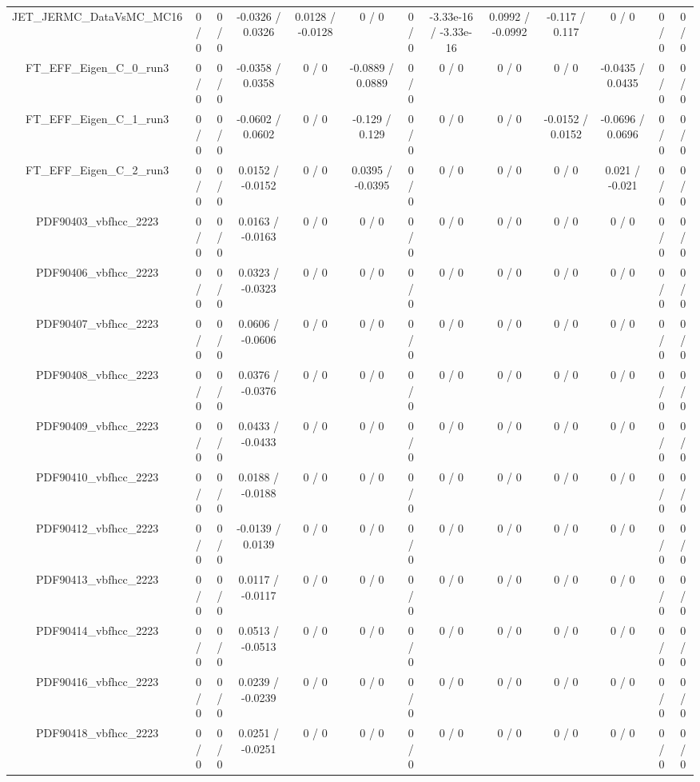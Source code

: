 \documentclass[10pt]{article}
\begin{document}
\begin{table}[htbp]
\begin{center}
\begin{tabular}{|c|c|c|c|c|c|c|c|c|c|c|c|c|}
  JET_JERMC_DataVsMC_MC16 & 0 / 0 & 0 / 0 & -0.0326 / 0.0326 & 0.0128 / -0.0128 & 0 / 0 & 0 / 0 & -3.33e-16 / -3.33e-16 & 0.0992 / -0.0992 & -0.117 / 0.117 & 0 / 0 & 0 / 0 & 0 / 0 \\ 
  FT_EFF_Eigen_C_0_run3 & 0 / 0 & 0 / 0 & -0.0358 / 0.0358 & 0 / 0 & -0.0889 / 0.0889 & 0 / 0 & 0 / 0 & 0 / 0 & 0 / 0 & -0.0435 / 0.0435 & 0 / 0 & 0 / 0 \\ 
  FT_EFF_Eigen_C_1_run3 & 0 / 0 & 0 / 0 & -0.0602 / 0.0602 & 0 / 0 & -0.129 / 0.129 & 0 / 0 & 0 / 0 & 0 / 0 & -0.0152 / 0.0152 & -0.0696 / 0.0696 & 0 / 0 & 0 / 0 \\ 
  FT_EFF_Eigen_C_2_run3 & 0 / 0 & 0 / 0 & 0.0152 / -0.0152 & 0 / 0 & 0.0395 / -0.0395 & 0 / 0 & 0 / 0 & 0 / 0 & 0 / 0 & 0.021 / -0.021 & 0 / 0 & 0 / 0 \\ 
  PDF90403_vbfhcc_2223 & 0 / 0 & 0 / 0 & 0.0163 / -0.0163 & 0 / 0 & 0 / 0 & 0 / 0 & 0 / 0 & 0 / 0 & 0 / 0 & 0 / 0 & 0 / 0 & 0 / 0 \\ 
  PDF90406_vbfhcc_2223 & 0 / 0 & 0 / 0 & 0.0323 / -0.0323 & 0 / 0 & 0 / 0 & 0 / 0 & 0 / 0 & 0 / 0 & 0 / 0 & 0 / 0 & 0 / 0 & 0 / 0 \\ 
  PDF90407_vbfhcc_2223 & 0 / 0 & 0 / 0 & 0.0606 / -0.0606 & 0 / 0 & 0 / 0 & 0 / 0 & 0 / 0 & 0 / 0 & 0 / 0 & 0 / 0 & 0 / 0 & 0 / 0 \\ 
  PDF90408_vbfhcc_2223 & 0 / 0 & 0 / 0 & 0.0376 / -0.0376 & 0 / 0 & 0 / 0 & 0 / 0 & 0 / 0 & 0 / 0 & 0 / 0 & 0 / 0 & 0 / 0 & 0 / 0 \\ 
  PDF90409_vbfhcc_2223 & 0 / 0 & 0 / 0 & 0.0433 / -0.0433 & 0 / 0 & 0 / 0 & 0 / 0 & 0 / 0 & 0 / 0 & 0 / 0 & 0 / 0 & 0 / 0 & 0 / 0 \\ 
  PDF90410_vbfhcc_2223 & 0 / 0 & 0 / 0 & 0.0188 / -0.0188 & 0 / 0 & 0 / 0 & 0 / 0 & 0 / 0 & 0 / 0 & 0 / 0 & 0 / 0 & 0 / 0 & 0 / 0 \\ 
  PDF90412_vbfhcc_2223 & 0 / 0 & 0 / 0 & -0.0139 / 0.0139 & 0 / 0 & 0 / 0 & 0 / 0 & 0 / 0 & 0 / 0 & 0 / 0 & 0 / 0 & 0 / 0 & 0 / 0 \\ 
  PDF90413_vbfhcc_2223 & 0 / 0 & 0 / 0 & 0.0117 / -0.0117 & 0 / 0 & 0 / 0 & 0 / 0 & 0 / 0 & 0 / 0 & 0 / 0 & 0 / 0 & 0 / 0 & 0 / 0 \\ 
  PDF90414_vbfhcc_2223 & 0 / 0 & 0 / 0 & 0.0513 / -0.0513 & 0 / 0 & 0 / 0 & 0 / 0 & 0 / 0 & 0 / 0 & 0 / 0 & 0 / 0 & 0 / 0 & 0 / 0 \\ 
  PDF90416_vbfhcc_2223 & 0 / 0 & 0 / 0 & 0.0239 / -0.0239 & 0 / 0 & 0 / 0 & 0 / 0 & 0 / 0 & 0 / 0 & 0 / 0 & 0 / 0 & 0 / 0 & 0 / 0 \\ 
  PDF90418_vbfhcc_2223 & 0 / 0 & 0 / 0 & 0.0251 / -0.0251 & 0 / 0 & 0 / 0 & 0 / 0 & 0 / 0 & 0 / 0 & 0 / 0 & 0 / 0 & 0 / 0 & 0 / 0 \\ 

\end{tabular}
\end{center}
\end{table}
\end{document}
